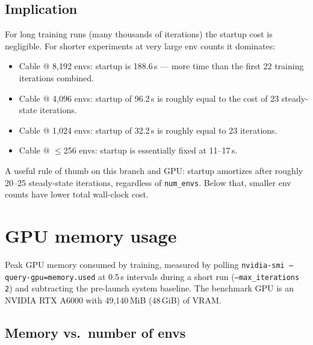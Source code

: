 \documentclass[a4paper,11pt]{article}
\begin{document}
\subsection{Implication}

For long training runs (many thousands of iterations) the startup cost is negligible. For shorter
experiments at very large env counts it dominates:
\begin{itemize}[leftmargin=1.4em, itemsep=0.2em]
  \item Cable @ 8{,}192 envs: startup is 188.6\,s --- more time than the first 22 training iterations combined.
  \item Cable @ 4{,}096 envs: startup of 96.2\,s is roughly equal to the cost of 23 steady-state iterations.
  \item Cable @ 1{,}024 envs: startup of 32.2\,s is roughly equal to 23 iterations.
  \item Cable @ $\leq$256 envs: startup is essentially fixed at 11--17\,s.
\end{itemize}

A useful rule of thumb on this branch and GPU: startup amortizes after roughly 20--25 steady-state
iterations, regardless of \texttt{num\_envs}. Below that, smaller env counts have lower total wall-clock cost.

\section{GPU memory usage}

Peak GPU memory consumed by training, measured by polling \texttt{nvidia-smi --query-gpu=memory.used}
at 0.5\,s intervals during a short run (\texttt{--max\_iterations 2}) and subtracting the pre-launch
system baseline. The benchmark GPU is an NVIDIA RTX A6000 with 49{,}140\,MiB (48\,GiB) of VRAM.

\subsection{Memory vs.\ number of envs}
\end{document}
